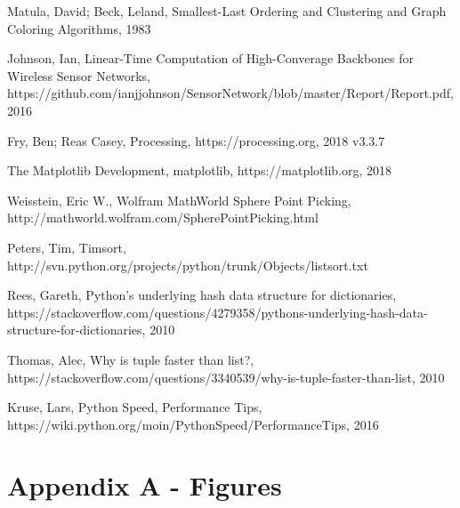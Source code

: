 \documentclass{article}
\begin{document}

\newpage

\begin{thebibliography}{10}
    Matula, David; Beck, Leland, Smallest-Last Ordering and Clustering and Graph Coloring Algorithms, 1983

    Johnson, Ian, Linear-Time Computation of High-Converage Backbones for Wireless Sensor Networks, https://github.com/ianjjohnson/SensorNetwork/blob/master/Report/Report.pdf, 2016

    Fry, Ben; Reas Casey, Processing, https://processing.org, 2018 v3.3.7

    The Matplotlib Development, matplotlib, https://matplotlib.org, 2018

    Weisstein, Eric W., Wolfram MathWorld Sphere Point Picking, http://mathworld.wolfram.com/SpherePointPicking.html

        Peters, Tim, Timsort, http://svn.python.org/projects/python/trunk/Objects/listsort.txt

    Rees, Gareth, Python's underlying hash data structure for dictionaries, https://stackoverflow.com/questions/4279358/pythons-underlying-hash-data-structure-for-dictionaries, 2010

    Thomas, Alec, Why is tuple faster than list?, https://stackoverflow.com/questions/3340539/why-is-tuple-faster-than-list, 2010

    Kruse, Lars, Python Speed, Performance Tips, https://wiki.python.org/moin/PythonSpeed/PerformanceTips, 2016

\end{thebibliography}

\newpage

\section{Appendix A - Figures}
\end{document}
